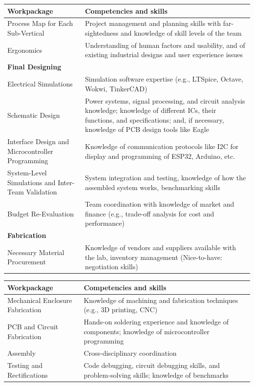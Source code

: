 \documentclass[12pt,a4paper]{article}
\begin{document}
\renewcommand{\arraystretch}{1.5}
\begin{tabular}{|m{4cm}|m{9cm}|}
    \hline
    \textbf{Workpackage} & \textbf{Competencies and skills} \\
    \hline
    Process Map for Each Sub-Vertical & Project management and planning skills with far-sightedness and knowledge of skill levels of the team \\
    \hline
    Ergonomics & Understanding of human factors and usability, and of existing industrial designs and user experience issues \\
    \hline
    \textbf{Final Designing} & \\
    \hline
    Electrical Simulations & Simulation software expertise (e.g., LTSpice, Octave, Wokwi, TinkerCAD) \\
    \hline
    Schematic Design & Power systems, signal processing, and circuit analysis knowledge; knowledge of different ICs, their functions, and specifications; and, if necessary, knowledge of PCB design tools like Eagle \\
    \hline
    Interface Design and Microcontroller Programming & Knowledge of communication protocols like I2C for display and programming of ESP32, Arduino, etc. \\
    \hline
    System-Level Simulations and Inter-Team Validation & System integration and testing, knowledge of how the assembled system works, benchmarking skills \\
    \hline
    Budget Re-Evaluation & Team coordination with knowledge of market and finance (e.g., trade-off analysis for cost and performance) \\
    \hline
    \textbf{Fabrication} & \\
    \hline
    Necessary Material Procurement & Knowledge of vendors and suppliers available with the lab, inventory management (Nice-to-have: negotiation skills) \\
    \hline
\end{tabular}

\renewcommand{\arraystretch}{1.5}
\begin{tabular}{|m{4cm}|m{9cm}|}
    \hline
    \textbf{Workpackage} & \textbf{Competencies and skills} \\
    \hline
    Mechanical Enclosure Fabrication & Knowledge of machining and fabrication techniques (e.g., 3D printing, CNC) \\
    \hline
    PCB and Circuit Fabrication & Hands-on soldering experience and knowledge of components; knowledge of microcontroller programming \\
    \hline
    Assembly & Cross-disciplinary coordination \\
    \hline
    Testing and Rectifications & Code debugging, circuit debugging skills, and problem-solving skills; knowledge of benchmarks \\
    \hline
\end{tabular}
\end{document}
